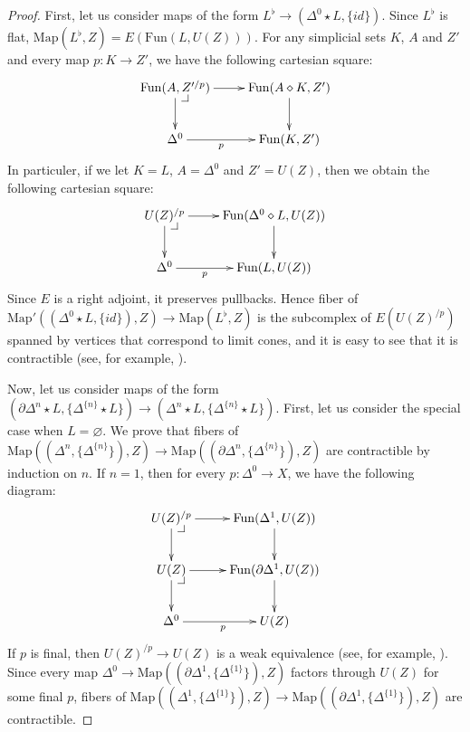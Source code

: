 \documentclass[reqno]{amsart}
\makeatletter
\theoremstyle{definition}
\theoremstyle{remark}
\newcommand{\join}{\star}
\newcommand{\fjoin}{\diamond}
\newcommand{\Map}{\mathrm{Map}}
\newcommand{\Fun}{\mathrm{Fun}}
\numberwithin{figure}{section}
\newcommand{\pb}[1][dr]{\save*!/#1-1.2pc/#1:(-1,1)@^{|-}\restore}
\makeatother
\begin{document}
\begin{proof}
First, let us consider maps of the form $L^\flat \to (\Delta^0 \join L, \{ id \})$.
Since $L^\flat$ is flat, $\Map(L^\flat,Z) = E(\Fun(L,U(Z)))$.
For any simplicial sets $K$, $A$ and $Z'$ and every map $p : K \to Z'$, we have the following cartesian square:
\[ \xymatrix{ \Fun(A,Z'^{/p}) \ar[r] \ar[d] \pb & \Fun(A \fjoin K, Z') \ar[d] \\
              \Delta^0 \ar[r]_-p & \Fun(K,Z')
            } \]
In particuler, if we let $K = L$, $A = \Delta^0$ and $Z' = U(Z)$, then we obtain the following cartesian square:
\[ \xymatrix{ U(Z)^{/p} \ar[r] \ar[d] \pb & \Fun(\Delta^0 \fjoin L, U(Z)) \ar[d] \\
              \Delta^0 \ar[r]_-p & \Fun(L,U(Z))
            } \]
Since $E$ is a right adjoint, it preserves pullbacks.
Hence fiber of $\Map'((\Delta^0 \join L, \{ id \}), Z) \to \Map(L^\flat, Z)$ is the subcomplex of $E(U(Z)^{/p})$
spanned by vertices that correspond to limit cones, and it is easy to see that it is contractible (see, for example, \cite[Lemma~2.11]{szumilo}).

Now, let us consider maps of the form $(\partial \Delta^n \join L, \{ \Delta^{\{n\}} \join L \}) \to (\Delta^n \join L, \{ \Delta^{\{n\}} \join L \})$.
First, let us consider the special case when $L = \varnothing$.
We prove that fibers of $\Map((\Delta^n, \{ \Delta^{\{n\}} \}), Z) \to \Map((\partial \Delta^n, \{ \Delta^{\{n\}} \}), Z)$ are contractible by induction on $n$.
If $n = 1$, then for every $p : \Delta^0 \to X$, we have the following diagram:
\[ \xymatrix{ U(Z)^{/p} \ar[d] \ar[r] \pb & \Fun(\Delta^1, U(Z)) \ar[d] \\
              U(Z) \ar[d] \ar[r] \pb & \Fun(\partial \Delta^1, U(Z)) \ar[d] \\
              \Delta^0 \ar[r]_p & U(Z)
            } \]
If $p$ is final, then $U(Z)^{/p} \to U(Z)$ is a weak equivalence (see, for example, \cite[Corollary~1.2.12.5]{lurie-topos}).
Since every map $\Delta^0 \to \Map((\partial \Delta^1, \{ \Delta^{\{1\}} \}), Z)$ factors through $U(Z)$ for some final $p$,
fibers of $\Map((\Delta^1, \{ \Delta^{\{1\}} \}), Z) \to \Map((\partial \Delta^1, \{ \Delta^{\{1\}} \}), Z)$ are contractible.


\end{proof}
\end{document}
